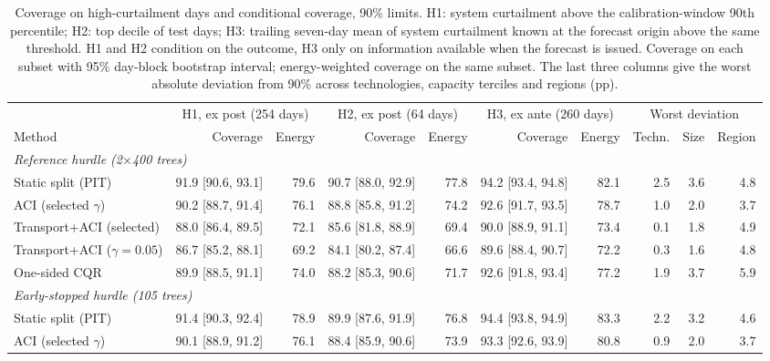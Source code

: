 \begin{table}[tp]
\centering
\footnotesize
\caption{Coverage on high-curtailment days and conditional coverage, 90\% limits. H1: system curtailment above the calibration-window 90th percentile; H2: top decile of test days; H3: trailing seven-day mean of system curtailment known at the forecast origin above the same threshold. H1 and H2 condition on the outcome, H3 only on information available when the forecast is issued. Coverage on each subset with 95\% day-block bootstrap interval; energy-weighted coverage on the same subset. The last three columns give the worst absolute deviation from 90\% across technologies, capacity terciles and regions (pp).}
\label{tab:altos}
\setlength{\tabcolsep}{3pt}
\begin{tabular}{l rrrrrr rrr}
\toprule
 & \multicolumn{2}{c}{H1, ex post (254 days)} & \multicolumn{2}{c}{H2, ex post (64 days)} & \multicolumn{2}{c}{H3, ex ante (260 days)} & \multicolumn{3}{c}{Worst deviation} \\
\cmidrule(lr){2-3}\cmidrule(lr){4-5}\cmidrule(lr){6-7}\cmidrule(lr){8-10}
Method & Coverage & Energy & Coverage & Energy & Coverage & Energy & Techn. & Size & Region \\
\midrule
\multicolumn{10}{l}{\textit{Reference hurdle (2$\times$400 trees)}} \\
\quad Static split (PIT) & 91.9 [90.6, 93.1] & 79.6 & 90.7 [88.0, 92.9] & 77.8 & 94.2 [93.4, 94.8] & 82.1 & 2.5 & 3.6 & 4.8 \\
\quad ACI (selected $\gamma$) & 90.2 [88.7, 91.4] & 76.1 & 88.8 [85.8, 91.2] & 74.2 & 92.6 [91.7, 93.5] & 78.7 & 1.0 & 2.0 & 3.7 \\
\quad Transport+ACI (selected) & 88.0 [86.4, 89.5] & 72.1 & 85.6 [81.8, 88.9] & 69.4 & 90.0 [88.9, 91.1] & 73.4 & 0.1 & 1.8 & 4.9 \\
\quad Transport+ACI ($\gamma=0.05$) & 86.7 [85.2, 88.1] & 69.2 & 84.1 [80.2, 87.4] & 66.6 & 89.6 [88.4, 90.7] & 72.2 & 0.3 & 1.6 & 4.8 \\
\quad One-sided CQR & 89.9 [88.5, 91.1] & 74.0 & 88.2 [85.3, 90.6] & 71.7 & 92.6 [91.8, 93.4] & 77.2 & 1.9 & 3.7 & 5.9 \\
\multicolumn{10}{l}{\textit{Early-stopped hurdle (105 trees)}} \\
\quad Static split (PIT) & 91.4 [90.3, 92.4] & 78.9 & 89.9 [87.6, 91.9] & 76.8 & 94.4 [93.8, 94.9] & 83.3 & 2.2 & 3.2 & 4.6 \\
\quad ACI (selected $\gamma$) & 90.1 [88.9, 91.2] & 76.1 & 88.4 [85.9, 90.6] & 73.9 & 93.3 [92.6, 93.9] & 80.8 & 0.9 & 2.0 & 3.7 \\

\end{tabular}
\end{table}
